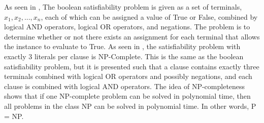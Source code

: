 \documentclass[manuscript]{acmart}
\begin{document}
        As seen in \cite{10.1145/800157.805047},
        The boolean satisfiability problem is given as a set of terminals, $x_1, x_2, ..., x_n$,
        each of which can be assigned a value of True or False,
        combined by logical AND operators, logical OR operators, and negations.
        The problem is to determine whether or not there exists an assignment
        for each terminal that allows the instance to evaluate to True.
        As seen in \cite{Karp1972}, the satisfiability problem
        with exactly 3 literals per clause is NP-Complete. This is the same 
        as the boolean satisfiability problem, but it is presented such that
        a clause contains exactly three terminals combined with logical OR operators
        and possibly negations, and each clause is combined with logical AND operators.
        The idea of NP-completeness shows that if one NP-complete problem can be solved
        in polynomial time, then all problems in the class NP can be solved in polynomial time.
        In other words, P = NP. 
\end{document}
